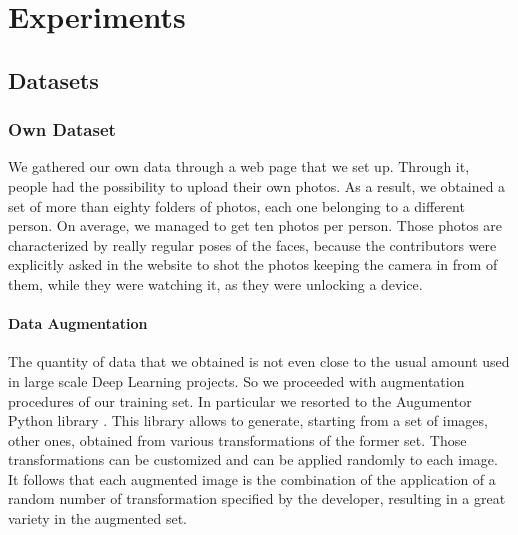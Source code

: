\section{Experiments} \label{sec:exp}

\subsection{Datasets}
\subsubsection{Own Dataset} \label{subsubsec:ownd}
We gathered our own data through a web page \cite{gdpdataret} that we set up. Through it, people had the possibility to upload their own photos. As a result, we obtained a set of more than eighty folders of photos, each one belonging to a different person. On average, we managed to get ten photos per person. Those photos are characterized by really regular poses of the faces, because the contributors were explicitly asked in the website to shot the photos keeping the camera in from of them, while they were watching it, as they were unlocking a device.
\paragraph{Data Augmentation}
The quantity of data that we obtained is not even close to the usual amount used in large scale Deep Learning projects. So we proceeded with augmentation procedures of our training set. In particular we resorted to the Augumentor Python library \cite{augmentor}. This library allows to generate, starting from a set of images, other ones, obtained from various transformations of the former set. Those transformations can be customized and can be applied randomly to each image. It follows that each augmented image is the combination of the application of a random number of transformation specified by the developer, resulting in a great variety in the augmented set.

